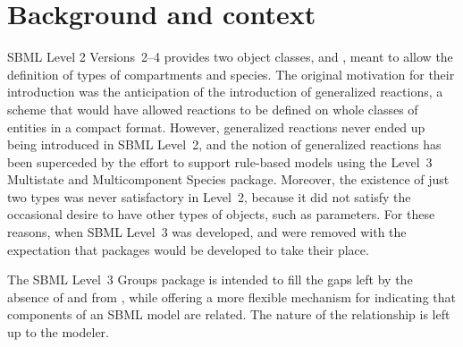 
\section{Background and context}
\label{background}

SBML Level 2 Versions~2--4 provides two object classes, \CompartmentType and \SpeciesType, meant to allow the definition of types of compartments and species. The original motivation for their introduction was the anticipation of the introduction of generalized reactions, a scheme that would have allowed reactions to be defined on whole classes of entities in a compact format. However, generalized reactions never ended up being introduced in SBML Level~2, and the notion of generalized reactions has been superceded by the effort to support rule-based models using the Level~3 Multistate and Multicomponent Species package.  Moreover, the existence of just two types was never satisfactory in Level~2, because it did not satisfy the occasional desire to have other types of objects, such as parameters.  For these reasons, when SBML Level~3 was developed, \CompartmentType and \SpeciesType were removed with the expectation that packages would be developed to take their place.

The SBML Level~3 Groups package is intended to fill the gaps left by the absence of \CompartmentType and \SpeciesType from \sbmlthreecore, while offering a more flexible mechanism for indicating that components of an SBML model are related.  The nature of the relationship is left up to the modeler.  

